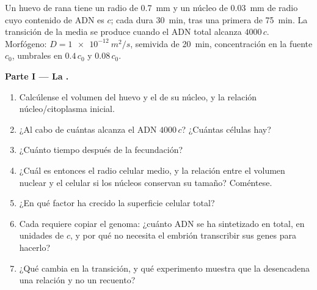 \begin{problem}
\label{pb:b2:vertebrate-development:1}
Un huevo de rana tiene un radio de \qty{0.7}{mm} y un núcleo de
\qty{0.03}{mm} de radio cuyo contenido de ADN es $c$; cada 
dura \qty{30}{min}, tras una primera de \qty{75}{min}. La transición de la
 media se produce cuando el ADN total alcanza $4000\,c$.
Morfógeno: $D =
\qty{1e-12}{m^2/s}$, semivida de \qty{20}{min}, concentración en la fuente
$c_0$, umbrales en $0.4\,c_0$ y $0.08\,c_0$.

\medskip
\noindent\textbf{Parte I --- La .}
\begin{enumerate}
  \item Calcúlense el volumen del huevo y el de su núcleo, y la relación
        núcleo/citoplasma inicial.
  \item ¿Al cabo de cuántas  alcanza el ADN $4000\,c$?
        ¿Cuántas células hay?
  \item ¿Cuánto tiempo después de la fecundación?
  \item ¿Cuál es entonces el radio celular medio, y la relación entre el
        volumen nuclear y el celular si los núcleos conservan su tamaño?
        Coméntese.
  \item ¿En qué factor ha crecido la superficie celular total?
  \item Cada  requiere copiar el genoma: ¿cuánto ADN se ha
        sintetizado en total, en unidades de $c$, y por qué no necesita el
        embrión transcribir sus genes para hacerlo?
  \item ¿Qué cambia en la transición, y qué experimento muestra que la
        desencadena una relación y no un recuento?
\end{enumerate}


\end{problem}
